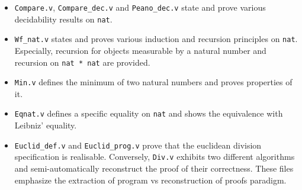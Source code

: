 \begin{itemize}

\item {\tt Compare.v}, {\tt Compare\_dec.v} and {\tt Peano\_dec.v} state
and prove various decidability results on {\tt nat}.

\item {\tt Wf\_nat.v} states and proves various induction and recursion 
principles on {\tt nat}. Especially, recursion for objects measurable by 
a natural number and recursion on {\tt nat * nat} are provided.

\item {\tt Min.v} defines the minimum of two natural numbers and proves 
properties of it. 

\item {\tt Eqnat.v} defines a specific equality on {\tt nat} and shows 
the equivalence with Leibniz' equality.

\item {\tt Euclid\_def.v} and {\tt Euclid\_prog.v} prove that the euclidean
division specification is realisable. Conversely, {\tt Div.v} exhibits
two different algorithms and semi-automatically reconstruct the proof of
their correctness. These files emphasize the extraction of program vs
reconstruction of proofs paradigm.

\end{itemize}
